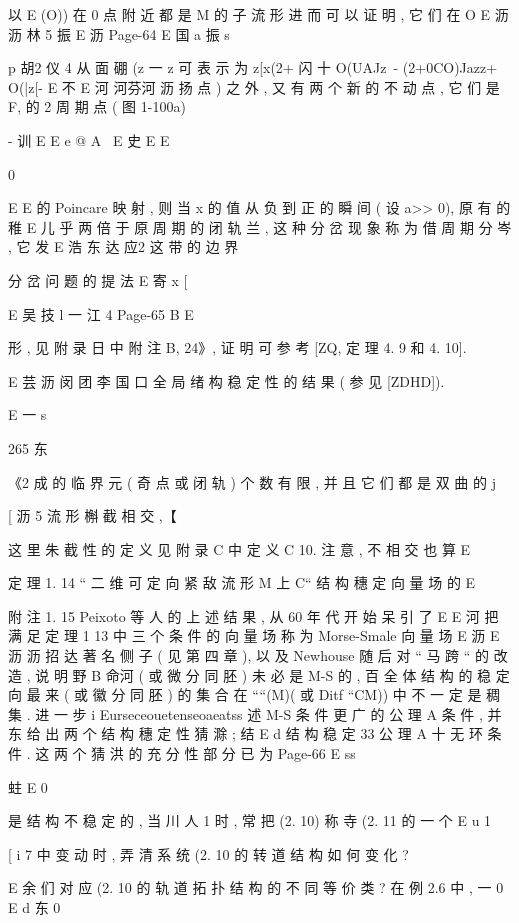 {以
E
(O)) 在 0 点 附 近 都 是 M 的 子 流 形 进 而 可 以 证 明 , 它 们 在 O
E 沥 沥 林 5 振
E 沥
Page-64
E 国 a 振 s

p 胡2 仪 4
从 面 硼 (z 一 z 可 表 示 为
z[x(2+ 闪 十 O(UAJz~- (2+0CO)Jazz+ O(|z[-
E 不
E 河 河芬河 沥 扬
点 ) 之 外 , 又 有 两 个 新 的 不 动 点 , 它 们 是 F, 的 2 周 期 点 ( 图 1-100a)

- 训
E
E
e @ A
\
E
史 E E

0

E
E
的 Poincare 映 射 , 则 当 x 的 值 从 负 到 正 的 瞬 间 ( 设 a>> 0), 原 有 的 稚
E
儿 乎 两 倍 于 原 周 期 的 闭 轨 兰 , 这 种 分 岔 现 象 称 为 借 周 期 分 岑 , 它 发
E 浩 东 达 应2
这 带 的 边 界

分 岔 问 题 的 提 法
E
寄 x [

E 吴 技 l 一 江 4
Page-65
B E

形 , 见 附 录 日 中 附 注 B, 24》, 证 明 可 参 考 [ZQ, 定 理 4. 9 和 4. 10].

E 芸 沥 闵 团 李 国 口
全 局 绪 构 稳 定 性 的 结 果 ( 参 见 [ZDHD]).

E 一
s

265 东

《2 成 的 临 界 元 ( 奇 点 或 闭 轨 ) 个 数 有 限 , 并 且 它 们 都 是 双 曲
的 j

[ 沥 5
流 形 槲 截 相 交 ,【

这 里 朱 截 性 的 定 义 见 附 录 C 中 定 义 C 10. 注 意 , 不 相 交 也 算
E

定 理 1. 14 “ 二 维 可 定 向 紧 敌 流 形 M 上 C“ 结 构 穗 定 向 量 场 的
E

附 注 1. 15 Peixoto 等 人 的 上 述 结 果 , 从 60 年 代 开 始 呆 引 了
E
E 河
把 满 足 定 理 1 13 中 三 个 条 件 的 向 量 场 称 为 Morse-Smale 向 量 场
E 沥
E 沥 沥 招 达
著 名 侧 子 ( 见 第 四 章 ), 以 及 Newhouse 随 后 对 “ 马 跨 “ 的 改 造 , 说 明
野 B 命河
( 或 微 分 同 胚 ) 未 必 是 M-S 的 , 百 全 体 结 构 的 稳 定 向 最 来 ( 或 徽 分
同 胚 ) 的 集 合 在 ““(M)( 或 Ditf “CM)) 中 不 一 定 是 稠 集 . 进 一 步
i
Eurseceouetenseoaeatss 述
M-S 条 件 更 广 的 公 理 A 条 件 , 并 东 给 出 两 个 结 构 穗 定 性 猜 滁 ; 结
E d
结 构 稳 定 33 公 理 A 十 无 环 条 件 . 这 两 个 猜 洪 的 充 分 性 部 分 已 为
Page-66
E ss

蛀 E 0

是 结 构 不 稳 定 的 , 当 川 人 1 时 , 常 把 (2. 10) 称 寺 (2. 11 的 一 个
E u 1

[ i
7 中 变 动 时 , 弄 清 系 统 (2. 10 的 转 道 结 构 如 何 变 化 ?

E 余
们 对 应 (2. 10 的 轨 道 拓 扑 结 构 的 不 同 等 价 类 ? 在 例 2.6 中 , 一 0
E d 东
0

}
